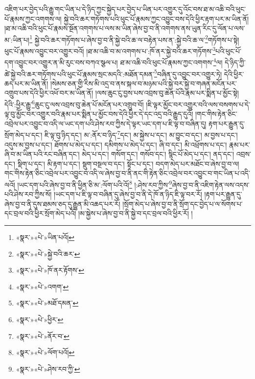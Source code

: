 འཇིག་པར་བྱེད་པའི་རྒྱུ་གང་ཡིན་པ་དེ་ཉིད་ཀྱང་སྐྱེད་པར་བྱེད་པ་ཡིན་པར་འགྱུར་དུ་འོང་བས་ཐ་མ་འཆི་བའི་ཕུང་པོ་རྣམས་ཀྱང་འགགས་ལ། སྐྱེ་བའི་ཆར་གཏོགས་པའི་ཕུང་པོ་རྣམས་ཀྱང་འབྱུང་བས་དེའི་ཕྱིར་རྟག་པར་མ་ཡིན་ནོ། །ཐ་མ་འཆི་བའི་ཕུང་པོ་རྣམས་སྔོན་འགགས་པ་ལས་མ་ཡིན་ཞེས་བྱ་བ་ནི་འགགས་ནས་ཡུན་རིང་དུ་ལོན་པ་ལས་མ་:ཡིན་པ།\footnote{«སྣར་»«པེ་»ཡིན་པའོ།} སྐྱེ་བའི་ཆར་གཏོགས་པ་ཞེས་བྱ་བ་ནི་སྐྱེ་བའི་ཆ་ལ་བརྟེན་པས་ན་:སྐྱེ་བའི་ཆ་ལ་\footnote{«སྣར་»«པེ་»སྐྱེ་བའི་ཆར་}གཏོགས་པ་སྟེ། ཕུང་པོ་རྣམས་འབྱུང་བར་འགྱུར་བའོ། །ཐ་མ་འཆི་བ་མ་འགགས་པ་:ཁོ་ནར་སྐྱེ་བའི་ཆར་གཏོགས་\footnote{«སྣར་»«པེ་»ཁོ་ནར་རྟོགས་}པའི་ཕུང་པོ་དག་འབྱུང་བར་འགྱུར་ན་མི་རུང་བས་བཀའ་སྩལ་པ། ཐ་མ་འཆི་བའི་ཕུང་པོ་རྣམས་ཀྱང་འགགས་\footnote{«སྣར་»«པེ་»འགག་}ལ། དེ་ཉིད་ཀྱི་ཚེ་སྐྱེ་བའི་ཆར་གཏོགས་པའི་ཕུང་པོ་རྣམས་སྲང་མདའི་:མཐོན་དམན་\footnote{«སྣར་»«པེ་»མཐོ་དམན་}བཞིན་དུ་འབྱུང་བར་འགྱུར་ཏེ། དེའི་ཕྱིར་ཆད་པར་མ་ཡིན་ནོ། །སེམས་ཅན་གྱི་རིས་མི་འདྲ་བ་ནས་སྐལ་བ་མཉམ་པའི་སྐྱེ་བར་སྐྱེ་བ་གཞན་མངོན་པར་འགྲུབ་པས་དེའི་ཕྱིར་འཕོ་བར་མ་ཡིན་ནོ། །ལས་ཆུང་ངུ་བྱས་པས་འབྲས་བུ་ཆེན་པོའི་རྣམ་པར་སྨིན་པ་མྱོང་སྟེ། དེའི་:ཕྱིར་རྒྱུ་\footnote{«སྣར་»«པེ་»ཕྱིར་}ཆུང་ངུ་ལས་འབྲས་བུ་ཆེན་པོ་མངོན་པར་འགྲུབ་བོ། །ཇི་ལྟར་མྱོང་བར་འགྱུར་བའི་ལས་བསགས་པ་དེ་ལྟ་བུ་མྱོང་བར་འགྱུར་བའི་རྣམ་པར་སྨིན་པ་མྱོང་བས་དེའི་ཕྱིར་དེ་དང་འདྲ་བའི་རྒྱུད་དུའོ། །གང་གིས་རྟེན་ཅིང་འབྲེལ་པར་འབྱུང་བ་འདི་ལ་ཡང་དག་པའི་ཤེས་རབ་ཀྱིས་དེ་ལྟར་ཡང་དག་པ་ཇི་ལྟ་བ་བཞིན་དུ། རྟག་པར་རྒྱུན་དུ་སྲོག་མེད་པ་དང་། ཇི་ལྟ་བུ་ཉིད་དང་། མ་:ནོར་བ་ཉིད་\footnote{«སྣར་»«པེ་»ནོར་བ་}དང་། མ་སྐྱེས་པ་དང་། མ་བྱུང་བ་དང་། མ་བྱས་པ་དང་། འདུས་མ་བྱས་པ་དང་། ཐོགས་པ་མེད་པ་དང་། དམིགས་པ་མེད་པ་དང་། ཞི་བ་དང་། མི་འཕྲོགས་པ་དང་། རྣམ་པར་ཞི་བ་མ་ཡིན་པའི་རང་བཞིན་དང་། མེད་པ་དང་། གསོག་དང་། གསོབ་དང་། སྙིང་པོ་མེད་པ་དང་། ནད་དང་། འབྲས་དང་། སྡིག་པ་དང་། མི་རྟག་པ་དང་། སྡུག་བསྔལ་བ་དང་། སྟོང་པ་དང་། བདག་མེད་པར་མཐོང་བ་ཞེས་བྱ་བ་ལ། གང་གིས་རྟེན་ཅིང་འབྲེལ་པར་འབྱུང་བ་འདི་ལ་ཞེས་བྱ་བ་ནི་ནང་གི་རྟེན་ཅིང་འབྲེལ་བར་འབྱུང་བ་གང་ཡིན་པ་འདི་ལའོ། །ཡང་དག་པའི་ཞེས་བྱ་བ་ནི་ཕྱིན་ཅི་མ་:ལོག་པའི་འོ།\footnote{«སྣར་»«པེ་»ལོག་པའོ།} །:ཤེས་རབ་ཀྱིས་\footnote{«སྣར་»«པེ་»ཤེས་རབ་ཀྱི་}ཞེས་བྱ་བ་ནི་འཇིག་རྟེན་ལས་འདས་པའི་ཤེས་རབ་ཀྱིས་སོ། །ཡང་དག་པ་ཇི་ལྟ་བ་བཞིན་དུ་ཞེས་བྱ་བ་ནི་དེ་ཁོ་ན་ཉིད་ཇི་ལྟ་བར་རོ། །རྟག་པར་རྒྱུན་དུ་ཞེས་བྱ་བ་ནི་དུས་ཐམས་ཅད་དུ་རྒྱུན་མི་འཆད་པར་རོ། །སྲོག་མེད་པ་ཞེས་བྱ་བ་ནི་སྲོག་དང་བྱེད་པ་ལ་སོགས་པ་དང་བྲལ་བའི་ཕྱིར་སྲོག་མེད་པའོ། །མ་སྐྱེས་པ་ཞེས་བྱ་བ་ནི་སྐྱེ་བ་དང་བྲལ་བའི་ཕྱིར་རོ། །
